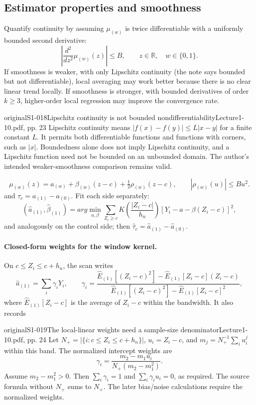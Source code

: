 \subsection{Estimator properties and smoothness}
Quantify continuity by assuming $\mu_{(w)}$ is twice differentiable with a uniformly bounded second derivative:
\[
\left|\frac{d^2}{dz^2}\mu_{(w)}(z)\right|\leq B,
\qquad z\in\mathbb R,\quad w\in\{0,1\}.
\]
If smoothness is weaker, with only Lipschitz continuity (the note says bounded but not differentiable), local averaging may work better because there is no clear linear trend locally. If smoothness is stronger, with bounded derivatives of order $k\geq3$, higher-order local regression may improve the convergence rate.
\begin{reviewnote}{original}{S1-018}{Lipschitz continuity is not bounded nondifferentiability}{Lecture1-10.pdf, pp. 23}
Lipschitz continuity means $|f(x)-f(y)|\le L|x-y|$ for a finite constant $L$. It permits both differentiable functions and functions with corners, such as $|x|$. Boundedness alone does not imply Lipschitz continuity, and a Lipschitz function need not be bounded on an unbounded domain. The author's intended weaker-smoothness comparison remains valid.
\end{reviewnote}

\[
\mu_{(w)}(z)=a_{(w)}+\beta_{(w)}(z-c)+\tfrac12\rho_{(w)}(z-c),
\qquad |\rho_{(w)}(u)|\leq Bu^2.
\]
 and $\tau_c=a_{(1)}-a_{(0)}$. Fit each side separately:
\[
(\widehat a_{(1)},\widehat\beta_{(1)})=arg\min_{a,\beta}
\sum_{Z_i\geq c}K\left(\frac{|Z_i-c|}{h_n}\right)[Y_i-a-\beta(Z_i-c)]^2,
\]
and analogously on the control side; then $\widehat\tau_c=\widehat a_{(1)}-\widehat a_{(0)}$.
\paragraph{Closed-form weights for the window kernel.}
On $c\leq Z_i\leq c+h_n$, the scan writes
\[
\widehat a_{(1)}=\sum_i\gamma_iY_i,\qquad
\gamma_i=\frac{\widehat E_{(1)}[(Z_i-c)^2]-\widehat E_{(1)}[Z_i-c](Z_i-c)}
{\widehat E_{(1)}[(Z_i-c)^2]-\widehat E_{(1)}[Z_i-c]^2},
\]
where $\widehat E_{(1)}[Z_i-c]$ is the average of $Z_i-c$ within the bandwidth. It also records
\begin{reviewnote}{original}{S1-019}{The local-linear weights need a sample-size denominator}{Lecture1-10.pdf, pp. 24}
Let $N_+=|\{i:c\le Z_i\le c+h_n\}|$, $u_i=Z_i-c$, and $m_j=N_+^{-1}\sum_i u_i^j$ within this band. The normalized intercept weights are
\[
\gamma_i=\frac{m_2-m_1u_i}{N_+(m_2-m_1^2)}.
\]
Assume $m_2-m_1^2>0$. Then $\sum_i\gamma_i=1$ and $\sum_i\gamma_i u_i=0$, as required. The source formula without $N_+$ sums to $N_+$. The later bias/noise calculations require the normalized weights.
\end{reviewnote}

